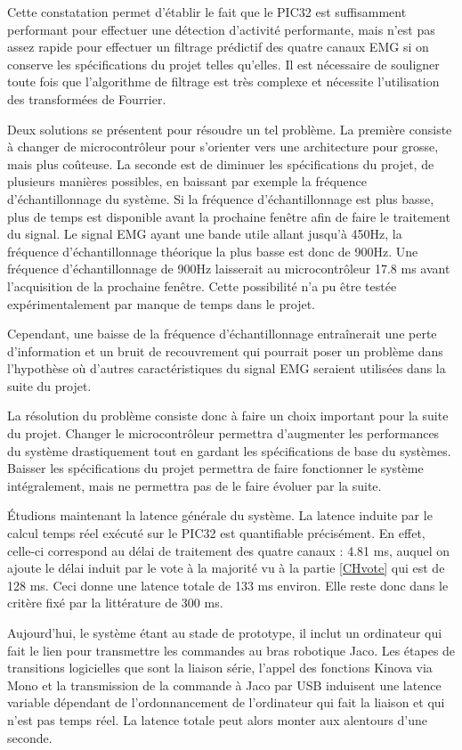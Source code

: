 \documentclass[letterpaper, twoside, 12pt, memoire, creativecommons, hyperref]{thETS}
\begin{document}
Cette constatation permet d'établir le fait que le PIC32 est suffisamment performant pour effectuer une détection d'activité performante, mais n'est pas assez rapide pour effectuer un filtrage prédictif des quatre canaux EMG si on conserve les spécifications du projet telles qu'elles. Il est nécessaire de souligner toute fois que l'algorithme de filtrage est très complexe et nécessite l'utilisation des transformées de Fourrier.

Deux solutions se présentent pour résoudre un tel problème. La première consiste à changer de microcontrôleur pour s'orienter vers une architecture pour grosse, mais plus coûteuse. La seconde est de diminuer les spécifications du projet, de plusieurs manières possibles, en baissant par exemple la fréquence d'échantillonnage du système. Si la fréquence d'échantillonnage est plus basse, plus de temps est disponible avant la prochaine fenêtre afin de faire le traitement du signal. Le signal EMG ayant une bande utile allant jusqu'à 450Hz, la fréquence d'échantillonnage théorique la plus basse est donc de 900Hz. Une fréquence d'échantillonnage de 900Hz laisserait au microcontrôleur 17.8 ms avant l'acquisition de la prochaine fenêtre. Cette possibilité n'a pu être testée expérimentalement par manque de temps dans le projet.

Cependant, une baisse de la fréquence d'échantillonnage entraînerait une perte d'information et un bruit de recouvrement qui pourrait poser un  problème dans l'hypothèse où d'autres caractéristiques du signal EMG seraient utilisées dans la suite du projet. 

La résolution du problème consiste donc à faire un choix important pour la suite du projet. Changer le microcontrôleur permettra d'augmenter les performances du système drastiquement tout en gardant les spécifications de base du systèmes. Baisser les spécifications du projet permettra de faire fonctionner le système intégralement, mais ne permettra pas de le faire évoluer par la suite. 

Étudions maintenant la latence générale du système. La latence induite par le calcul temps réel exécuté sur le PIC32 est quantifiable précisément. En effet, celle-ci correspond au délai de traitement des quatre canaux : 4.81 ms, auquel on ajoute le délai induit par le vote à la majorité vu à la partie \ref{CHvote} qui est de 128 ms. Ceci donne une latence totale de 133 ms environ. Elle reste donc dans le critère fixé par la littérature de 300 ms. 

Aujourd'hui, le système étant au stade de prototype, il inclut un ordinateur qui fait le lien pour transmettre les commandes au bras robotique Jaco. Les étapes de transitions logicielles que sont la liaison série, l'appel des fonctions Kinova via Mono et la transmission de la commande à Jaco par USB induisent une latence variable dépendant de l'ordonnancement de l'ordinateur qui fait la liaison et qui n'est pas temps réel. La latence totale peut alors monter aux alentours d'une seconde. 
\end{document}

